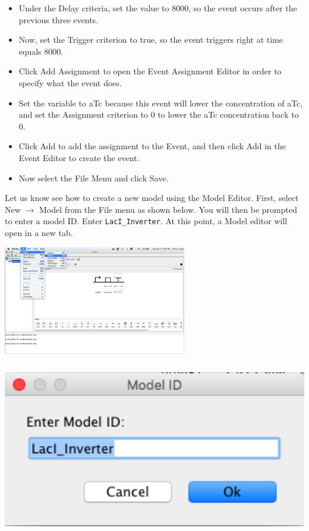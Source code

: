 \documentclass[titlepage,11pt]{article}
\begin{document}
\begin{itemize}
\item Under the Delay criteria, set the value to 8000, so the event occurs after the previous three events.
\item Now, set the Trigger criterion to true, so the event triggers right at time equals 8000.
\item Click Add Assignment to open the Event Assignment Editor in order to specify what the event does.
\item Set the variable to aTc because this event will lower the concentration of aTc, and set the Assignment criterion to 0 to lower the aTc concentration back to 0.
\item Click Add to add the assignment to the Event, and then click Add in the Event Editor to create the event.
\item Now select the File Menu and click Save.
\end{itemize}

Let us know see how to create a new model using the Model Editor.  First, select New $\rightarrow$ Model from the File menu as shown below. You will then be prompted to enter a model ID.  Enter {\tt LacI\_Inverter}.  At this point, a Model editor will open in a new tab.

\begin{center}
\includegraphics[width=80mm]{screenshots/newModel}
\end{center}

\begin{center}
\includegraphics[height=75mm]{screenshots/ModelIdGT}
\end{center}
\end{document}
